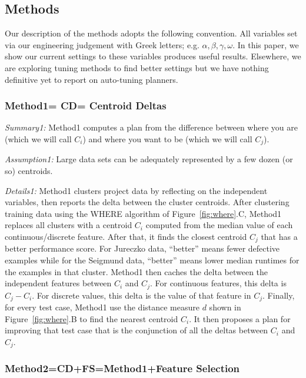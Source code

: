 \documentclass{sig-alternate}
\newcommand{\fig}[1]{Figure~\ref{fig:#1}}
\begin{document}
 \subsection{  Methods}

Our  description of the methods adopts the following convention. All variables
  set via  our engineering judgement  with Greek letters; e.g. $\alpha,\beta,\gamma,\omega$.
  In this paper, we show our current settings to these variables produces useful
  results. Elsewhere\cite{krall14,fu:ase15}, we are exploring tuning methods to 
  find better settings but  we have nothing definitive yet to report
  on auto-tuning planners.

\subsubsection{Method1= CD=   Centroid Deltas}


 {\em Summary1:} Method1  computes a plan from the difference between where you are  (which we will call $C_i$) and
where you want to be  (which we will call $C_j$).

{\em Assumption1: } Large data sets can be adequately represented by a few dozen (or so) 
centroids.
 
 {\em Details1:} Method1 clusters project data by reflecting   on the independent variables, then
  reports the delta between the cluster centroids. 
  After clustering   training data using the WHERE algorithm of  \fig{where}.C, Method1
replaces all clusters with a  centroid $C_i$ computed from the median value of each
continuous/discrete feature. After that, it
finds the closest centroid $C_j$ that has a better
performance score. For Jureczko data, ``better'' means fewer defective examples while for the Seigmund data,
``better'' means lower median runtimes for the examples in that cluster.
Method1 then caches the  delta between the independent features between $C_i$ and $C_j$. For continuous
features, this delta is $C_j - C_i$. For discrete values, this delta is the value of that feature
in $C_j$. 
Finally, for every test case, Method1 use the distance measure $d$ shown in \fig{where}.B to find
the nearest centroid $C_i$.  It then proposes a plan for improving that test case
that is the conjunction of all the deltas between $C_i$ and $C_j$.


\subsubsection{Method2=CD+FS=Method1+Feature Selection }
 
\end{document}
